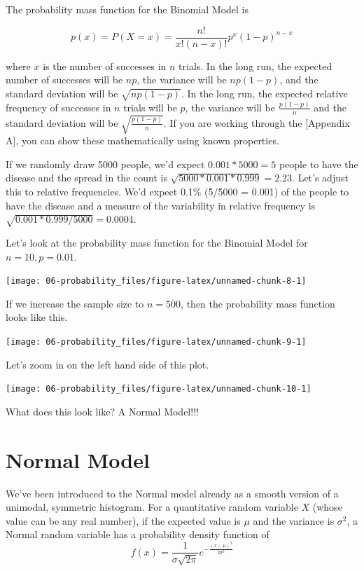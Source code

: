 \documentclass[
]{book}
\begin{document}
The probability mass function for the Binomial Model is

\[p(x) = P(X = x) = \frac{n!}{x!(n-x)!}p^x(1-p)^{n-x}\]

where \(x\) is the number of successes in \(n\) trials. In the long run, the expected number of successes will be \(np\), the variance will be \(np(1-p)\), and the standard deviation will be \(\sqrt{np(1-p)}\). In the long run, the expected relative frequency of successes in \(n\) trials will be \(p\), the variance will be \(\frac{p(1-p)}{n}\) and the standard deviation will be \(\sqrt{\frac{p(1-p)}{n}}\). If you are working through the {[}Appendix A{]}, you can show these mathematically using known properties.

If we randomly draw 5000 people, we'd expect \(0.001*5000 = 5\) people to have the disease and the spread in the count is \(\sqrt{5000*0.001*0.999} = 2.23\). Let's adjust this to relative frequencies. We'd expect 0.1\% (5/5000 = 0.001) of the people to have the disease and a measure of the variability in relative frequency is \(\sqrt{0.001*0.999/5000} = 0.0004\).

Let's look at the probability mass function for the Binomial Model for \(n = 10, p = 0.01\).

\begin{center}\texttt{[image: 06-probability\_files/figure-latex/unnamed-chunk-8-1]} \end{center}

If we increase the sample size to \(n = 500\), then the probability mass function looks like this.

\begin{center}\texttt{[image: 06-probability\_files/figure-latex/unnamed-chunk-9-1]} \end{center}

Let's zoom in on the left hand side of this plot.

\begin{center}\texttt{[image: 06-probability\_files/figure-latex/unnamed-chunk-10-1]} \end{center}

What does this look like? A Normal Model!!!

\hypertarget{normal-model}{%
\section{Normal Model}\label{normal-model}}

We've been introduced to the Normal model already as a smooth version of a unimodal, symmetric histogram. For a quantitative random variable \(X\) (whose value can be any real number), if the expected value is \(\mu\) and the variance is \(\sigma^2\), a Normal random variable has a probability density function of
\[f(x) =  \frac{1}{\sigma\sqrt{2\pi}}e^{-\frac{(x-\mu)^2}{2\sigma^2}}\]
\end{document}
